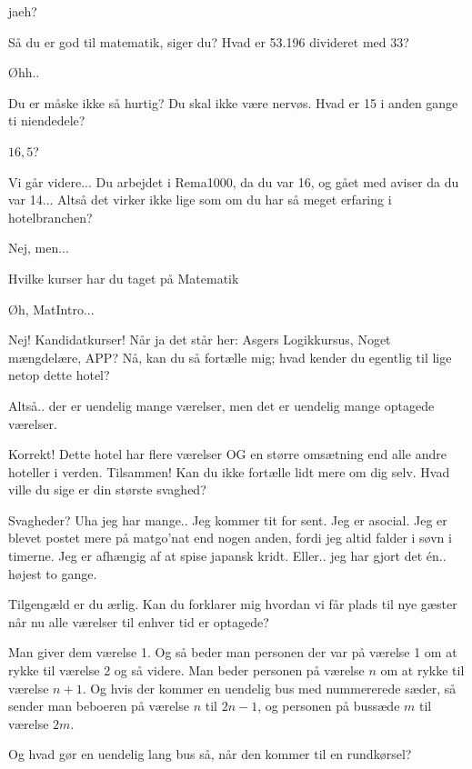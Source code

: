 \documentclass[a4paper,11pt]{article}
\begin{document}
\begin{sketch}
 jaeh?

 Så du er god til matematik, siger du? Hvad er 53.196 divideret med 33?

 Øhh..

  Du er måske ikke så hurtig? Du skal ikke være nervøs. Hvad er 15 i anden gange ti niendedele?

 $16,5$?

 Vi går videre...  Du arbejdet i Rema1000, da du var 16, og gået med aviser da du var 14... Altså det virker ikke lige som om du har så meget erfaring i hotelbranchen?

 Nej, men...

 Hvilke kurser har du taget på Matematik

 Øh, MatIntro...

 Nej! Kandidatkurser! Når ja det står her: Asgers Logikkursus, Noget mængdelære, APP?  Nå, kan du så fortælle mig; hvad kender du egentlig til lige netop dette hotel?

 Altså.. der er uendelig mange værelser, men det er uendelig mange optagede værelser.

 Korrekt! Dette hotel har flere værelser OG en større omsætning end alle andre hoteller i verden. Tilsammen! Kan du ikke fortælle lidt mere om dig selv. Hvad ville du sige er din største svaghed?

 Svagheder? Uha jeg har mange.. Jeg kommer tit for sent. Jeg er asocial. Jeg er blevet postet mere på matgo'nat end nogen anden, fordi jeg altid falder i søvn i timerne. Jeg er afhængig af at spise japansk kridt. Eller.. jeg har gjort det én.. højest to gange.

 Tilgengæld er du ærlig. Kan du forklarer mig hvordan vi får plads til nye gæster når nu alle værelser til enhver tid er optagede?

  Man giver dem værelse 1. Og så beder man personen der var på værelse 1 om at rykke til værelse 2 og så videre. Man beder personen på værelse $n$ om at rykke til værelse $n+1$. Og hvis der kommer en uendelig bus med nummererede sæder, så sender man beboeren på værelse $n$ til $2n-1$, og personen på bussæde $m$ til værelse $2m$.

 Og hvad gør en uendelig lang bus så, når den kommer til en rundkørsel?


\end{sketch}
\end{document}
